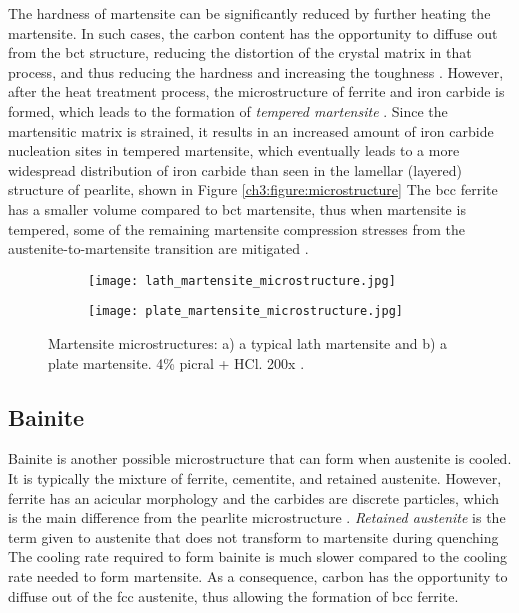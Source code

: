 The hardness of martensite can be significantly reduced by further heating the martensite. In such cases, the carbon content has the opportunity to diffuse out from the bct structure, reducing the distortion of the crystal matrix in that process, and thus reducing the hardness and increasing the toughness \cite{bhadeshia2017steels}. However, after the heat treatment process, the microstructure of ferrite and iron carbide is formed, which leads to the formation of \emph{tempered martensite} \cite{bajaj2020steels}. Since the martensitic matrix is strained, it results in an increased amount of iron carbide nucleation sites in tempered martensite, which eventually leads to a more widespread distribution of iron carbide than seen in the lamellar (layered) structure of pearlite, shown in Figure \ref{ch3:figure:microstructure} \cite{bajaj2020steels} The bcc ferrite has a smaller volume compared to bct martensite, thus when martensite is tempered, some of the remaining martensite compression stresses from the austenite-to-martensite transition are mitigated \cite{molabe2018determining}.

\begin{figure}[H]
\centering

\begin{subfigure}{.45\textwidth}
    \centering
    \texttt{[image: lath\_martensite\_microstructure.jpg]}
    \caption{}
\end{subfigure}
\begin{subfigure}{.45\textwidth}
    \centering
    \texttt{[image: plate\_martensite\_microstructure.jpg]}
    \caption{}
\end{subfigure}

\caption{Martensite microstructures: a) a typical lath martensite and b) a plate martensite. 4\% picral + HCl. 200x \cite{molabe2018determining}.}
\label{ch3:figure:martensite:microstructures}
\end{figure}

\subsection{Bainite}
Bainite is another possible microstructure that can form when austenite is cooled. It is typically the mixture of ferrite, cementite, and retained austenite. However, ferrite has an acicular morphology and the carbides are discrete particles, which is the main difference from the pearlite microstructure \cite{molabe2018determining}. \emph{Retained austenite} is the term given to austenite that does not transform to martensite during quenching \cite{bajaj2020steels} The cooling rate required to form bainite is much slower compared to the cooling rate needed to form martensite. As a consequence, carbon has the opportunity to diffuse out of the fcc austenite, thus allowing the formation of bcc ferrite.  

